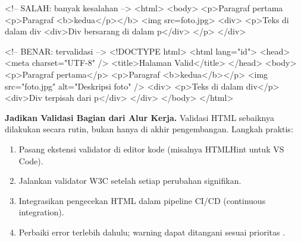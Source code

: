 \begin{webcode}[language=HTML, caption={Contoh HTML invalid dan versi yang diperbaiki}]
<!-- SALAH: banyak kesalahan -->
<html>
<body>
<p>Paragraf pertama
<p>Paragraf <b>kedua</p></b>
<img src=foto.jpg>
<div>
  <p>Teks di dalam div
    <div>Div bersarang di dalam p</div>
  </p>
</div>

<!-- BENAR: tervalidasi -->
<!DOCTYPE html>
<html lang="id">
<head>
  <meta charset="UTF-8" />
  <title>Halaman Valid</title>
</head>
<body>
  <p>Paragraf pertama</p>
  <p>Paragraf <b>kedua</b></p>
  <img src="foto.jpg" alt="Deskripsi foto" />
  <div>
    <p>Teks di dalam div</p>
    <div>Div terpisah dari p</div>
  </div>
</body>
</html>
\end{webcode}

\begin{konsep}
\textbf{Jadikan Validasi Bagian dari Alur Kerja.} Validasi HTML sebaiknya dilakukan secara rutin, bukan hanya di akhir pengembangan. Langkah praktis:
\begin{enumerate}
  \item Pasang ekstensi validator di editor kode (misalnya HTMLHint untuk VS Code).
  \item Jalankan validator W3C setelah setiap perubahan signifikan.
  \item Integrasikan pengecekan HTML dalam pipeline CI/CD (continuous integration).
  \item Perbaiki error terlebih dahulu; warning dapat ditangani sesuai prioritas \cite{mdnLearn}.
\end{enumerate}
\end{konsep}

